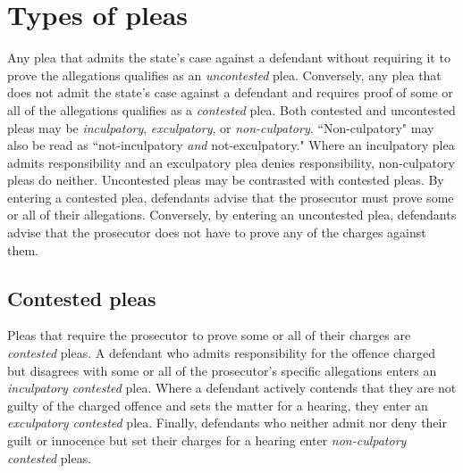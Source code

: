 \section{Types of pleas}

Any plea that admits the state's case against a defendant without requiring it to prove the allegations qualifies as an \textit{uncontested} plea. Conversely, any plea that does not admit the state's case against a defendant and requires proof of some or all of the allegations qualifies as a \textit{contested} plea. Both contested and uncontested pleas may be \textit{inculpatory}, \textit{exculpatory}, or \textit{non-culpatory}. ``Non-culpatory" may also be read as ``not-inculpatory \textit{and} not-exculpatory." Where an inculpatory plea admits responsibility and an exculpatory plea denies responsibility, non-culpatory pleas do neither. Uncontested pleas may be contrasted with contested pleas. By entering a contested plea, defendants advise that the prosecutor must prove some or all of their allegations. Conversely, by entering an uncontested plea, defendants advise that the prosecutor does not have to prove any of the charges against them. 

\subsection{Contested pleas}

Pleas that require the prosecutor to prove some or all of their charges are \textit{contested} pleas. A defendant who admits responsibility for the offence charged but disagrees with some or all of the prosecutor's specific allegations enters an \textit{inculpatory contested} plea. Where a defendant actively contends that they are not guilty of the charged offence and sets the matter for a hearing, they enter an \textit{exculpatory contested} plea. Finally, defendants who neither admit nor deny their guilt or innocence but set their charges for a hearing enter \textit{non-culpatory contested} pleas.

